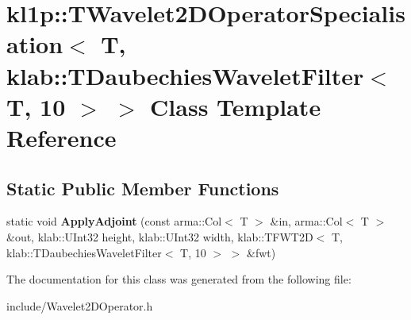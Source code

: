 \hypertarget{classkl1p_1_1TWavelet2DOperatorSpecialisation_3_01T_00_01klab_1_1TDaubechiesWaveletFilter_3_01T_00_0110_01_4_01_4}{}\section{kl1p\+:\+:T\+Wavelet2\+D\+Operator\+Specialisation$<$ T, klab\+:\+:T\+Daubechies\+Wavelet\+Filter$<$ T, 10 $>$ $>$ Class Template Reference}
\label{classkl1p_1_1TWavelet2DOperatorSpecialisation_3_01T_00_01klab_1_1TDaubechiesWaveletFilter_3_01T_00_0110_01_4_01_4}
\subsection*{Static Public Member Functions}
\begin{DoxyCompactItemize}
\item 
static void {\bfseries Apply\+Adjoint} (const arma\+::\+Col$<$ T $>$ \&in, arma\+::\+Col$<$ T $>$ \&out, klab\+::\+U\+Int32 height, klab\+::\+U\+Int32 width, klab\+::\+T\+F\+W\+T2D$<$ T, klab\+::\+T\+Daubechies\+Wavelet\+Filter$<$ T, 10 $>$ $>$ \&fwt)\hypertarget{classkl1p_1_1TWavelet2DOperatorSpecialisation_3_01T_00_01klab_1_1TDaubechiesWaveletFilter_3_01T_00_0110_01_4_01_4_a0540ab49a04b1901c264c8c6772cfc1b}{}\label{classkl1p_1_1TWavelet2DOperatorSpecialisation_3_01T_00_01klab_1_1TDaubechiesWaveletFilter_3_01T_00_0110_01_4_01_4_a0540ab49a04b1901c264c8c6772cfc1b}

\end{DoxyCompactItemize}


The documentation for this class was generated from the following file\+:\begin{DoxyCompactItemize}
\item 
include/Wavelet2\+D\+Operator.\+h\end{DoxyCompactItemize}
